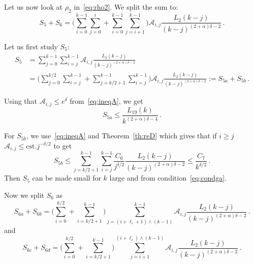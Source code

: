 \documentclass[10pt]{amsart}
\theoremstyle{definition}\newtheorem{defi}[theo]{Definition}\newtheorem{rema}[theo]{Remark}\newtheorem{exam}[theo]{Example}\newtheorem{exem}[theo]{Example}\newtheorem{nota}[theo]{Notation}
\newcommand{\ga}{\alpha}
\newcommand{\gd}{\delta}
\newcommand{\cA}{\ensuremath{\mathcal{A}}}
\newcommand\cst{\mathrm{cst}}
\begin{document}
Let us now look at $\rho_2$ in~\eqref{eq:rho2}. We split the sum to:
\begin{equation}
S_5 + S_6 = \bigg(\sum_{i=0}^{k-1} \sum_{j=0}^{i} + \sum_{i=0}^{k-1} \sum_{j=i+1}^{k-1} \bigg) \cA_{i,j} \frac{L_{2}(k-j)}{(k-j)^{(2+\ga)\delta -2}}\,.
\end{equation}

Let us first study $S_5$:
\begin{equation}
\begin{split}
S_5 & = \sum_{j=0}^{k-1} \sum_{i=j}^{k-1} \cA_{i,j} \frac{L_{2}(k-j)}{(k-j)^{(2+\ga)\delta -2}} \\
& = \bigg(\sum_{j=0}^{ k/2 } \sum_{i=j}^{k-1} + \sum_{ j= k/2 +1 }^{k-1} \sum_{i=j}^{k-1} \bigg)
\cA_{i,j} \frac{L_{2}(k-j)}{(k-j)^{(2+\ga)\delta -2}} := S_{5a} + S_{5b}\,.
\end{split}
\end{equation}

Using that $\cA_{i,j} \le e^{\delta}$ from~\eqref{eq:ineqA}, we get
\begin{equation}
S_{5a} \le \frac{L_{19}(k)}{k^{(2+\ga)\delta -4 }}\,.
\end{equation}

For $S_{5b}$, we use~\eqref{eq:ineqA} and Theorem~\ref{th:reD} which gives that if $i\geq j$ $\cA_{i,j} \leq \cst. j^{-\gd/2}$ to get
\begin{equation}
S_{5b} \le \sum_{ j= k/2 +1 }^{k-1} \sum_{i=j}^{k-1} \frac{C_6}{j^{\delta/2}} \frac{L_{2}(k-j)}{(k-j)^{(2+\ga)\delta -2}} \le \frac{C_7}{k^{ \delta/2}}\,.
\end{equation}
Then $S_5$ can be made small for $k$ large and from condition~\eqref{eq:condga}.

Now we split $S_6$ as
\begin{equation}
S_{6a} + S_{6b} = \bigg(\sum_{i=0}^{ k/2 } + \sum_{i= k/2 + 1}^{k-1} \bigg) \sum_{j=(i+ \ell_i +1) \wedge (k-1)}^{k-1} \cA_{i,j} \frac{L_{2}(k-j)}{(k-j)^{(2+\ga)\delta -2}}\,.
\end{equation}
and
\begin{equation}
S_{6c} + S_{6d} = \bigg(\sum_{i=0}^{ k/2 } + \sum_{i= k/2 +1}^{k-1} \bigg) \sum_{j=i + 1}^{(i+ \ell_i) \wedge (k-1)} \cA_{i,j} \frac{L_{2}(k-j)}{(k-j)^{(2+\ga)\delta -2}}\,.
\end{equation}
\end{document}

